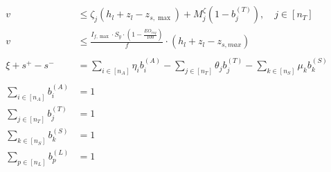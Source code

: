 \documentclass[11pt]{article}
\begin{document}
\begin{align*}
  \\
  v &\leq \zeta_j(h_l + z_l-z_{s,\max}) + M_j^\zeta(1-b_j^{(T)}), \quad j \in [n_T]\\
  v &\leq  \frac{I_{f,\max} \cdot S_y \cdot (1-\frac{EO_{req}}{100})}{f} \cdot (h_l + z_l - z_{s,max})\\
  \\
  \xi + s^+ - s^-&= \sum_{i \in [n_A]} \eta_ib_i^{(A)} - \sum_{j \in [n_T]} \theta_jb_j^{(T)} - \sum_{k \in [n_S]} \mu_kb_k^{(S)}\\
  \\
  \sum_{i \in [n_A]} b_i^{(A)} &=1\\
  \sum_{j \in [n_T]} b_j^{(T)} &=1\\
  \sum_{k \in [n_S]} b_k^{(S)} &=1\\
  \sum_{p \in [n_L]} b_p^{(L)} &=1\\
\end{align*}
\end{document}
